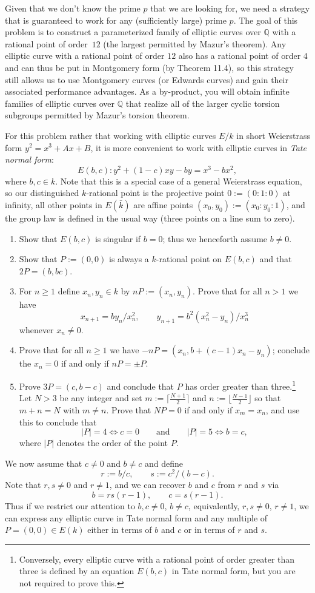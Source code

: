 \documentclass[11pt]{article}
\newcommand{\Q}{\mathbb{Q}}
\theoremstyle{definition}
\begin{document}
Given that we don't know the prime $p$ that we are looking for, we need a strategy that is guaranteed to work for any (sufficiently large) prime $p$.  The goal of this problem is to construct a parameterized family of elliptic curves over $\Q$ with a rational point of order~$12$ (the largest permitted by Mazur's theorem).  Any elliptic curve with a rational point of order $12$ also has a rational point of order $4$ and can thus be put in Montgomery form (by Theorem 11.4), so this strategy still allows us to use Montgomery curves (or Edwards curves) and gain their associated performance advantages.  As a by-product, you will obtain infinite families of elliptic curves over $\Q$ that realize all of the larger cyclic torsion subgroups permitted by Mazur's torsion theorem.

For this problem rather that working with elliptic curves $E/k$ in short Weierstrass form $y^2=x^3+Ax+B$, it is more convenient to work with elliptic curves in \emph{Tate normal form}:
\[
E(b,c)\colon y^2 + (1-c)xy-by = x^3-bx^2,
\]
where $b,c\in k$.  Note that this is a special case of a general Weierstrass equation, so our distinguished $k$-rational point is the projective point $0:= (0:1:0)$ at infinity, all other points in $E(\bar k)$ are affine points $(x_0,y_0):=(x_0:y_0:1)$, and the group law is defined in the usual way (three points on a line sum to zero).

\begin{enumerate}[{\bf (a)}]
\item Show that $E(b,c)$ is singular if $b=0$; thus we henceforth assume $b\ne 0$.
\item Show that $P:=(0,0)$ is always a $k$-rational point on $E(b,c)$ and that $2P=(b,bc)$.
\item For $n\ge 1$ define $x_n,y_n\in k$ by $nP:=(x_n,y_n)$.  Prove that for all $n>1$ we have
\[
x_{n+1} = by_n/x_n^2,\qquad y_{n+1}=b^2(x_n^2-y_n)/x_n^3
\]
whenever $x_n\ne 0$.
\item Prove that for all $n\ge 1$ we have $-nP = (x_n,b+(c-1)x_n-y_n)$; conclude the $x_n=0$ if and only if $nP=\pm P$.
\item Prove $3P=(c,b-c)$ and conclude that $P$ has order greater than three.\footnote{Conversely, every elliptic curve with a rational point of order greater than three is defined by an equation $E(b,c)$ in Tate normal form, but you are not required to prove this.}
Let $N>3$ be any integer and set $m:=\lceil\frac{N+1}{2}\rceil$ and $n:=\lfloor\frac{N-1}{2}\rfloor$ so that $m+n=N$ with $m\ne n$.
Prove that $NP=0$ if and only if $x_m=x_n$, and use this to conclude that
\[
|P|=4\Longleftrightarrow c=0\qquad\text{and}\qquad |P|=5\Longleftrightarrow b=c,
\]
where $|P|$ denotes the order of the point $P$.
\end{enumerate}
\noindent
We now assume that $c\ne 0$ and $b\ne c$ and define
\[
r:=b/c,\qquad s:=c^2/(b-c).
\]
Note that $r,s\ne 0$ and $r\ne 1$, and we can recover $b$ and $c$ from $r$ and $s$ via
\[
b=rs(r-1),\qquad c=s(r-1).
\]
Thus if we restrict our attention to $b,c\ne 0$, $b\ne c$, equivalently, $r,s\ne 0$, $r\ne 1$, we can express any elliptic curve in Tate normal form and any multiple of $P=(0,0)\in E(k)$ either in terms of $b$ and $c$ or in terms of $r$ and $s$.
\end{document}
